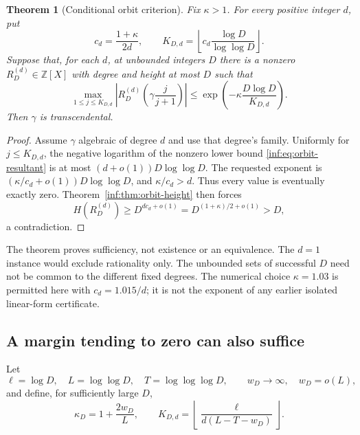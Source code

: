 \documentclass[11pt,a4paper]{article}
\newcommand{\Z}{\mathbb Z}
\newtheorem{theorem}{Theorem}[section]
\theoremstyle{definition}
\theoremstyle{remark}
\numberwithin{equation}{section}
\begin{document}
\begin{theorem}[Conditional orbit criterion]\label{inf:thm:kappa}
Fix $\kappa>1$. For every positive integer $d$, put
\[
 c_d=\frac{1+\kappa}{2d},\qquad
 K_{D,d}=\left\lfloor c_d\frac{\log D}{\log\log D}\right\rfloor.
\]
Suppose that, for each $d$, at unbounded integers $D$ there is a nonzero $R_D^{(d)}\in\Z[X]$ with degree and height at most $D$ such that
\begin{equation}\label{inf:eq:orbit-hypothesis}
 \max_{1\le j\le K_{D,d}}
 \left|R_D^{(d)}\left(\gamma\frac j{j+1}\right)\right|
 \le\exp\left(-\kappa\frac{D\log D}{K_{D,d}}\right).
\end{equation}
Then $\gamma$ is transcendental.
\end{theorem}
\begin{proof}
Assume $\gamma$ algebraic of degree $d$ and use that degree's family. Uniformly for $j\le K_{D,d}$, the negative logarithm of the nonzero lower bound \eqref{inf:eq:orbit-resultant} is at most $(d+o(1))D\log\log D$. The requested exponent is $(\kappa/c_d+o(1))D\log\log D$, and $\kappa/c_d>d$. Thus every value is eventually exactly zero. Theorem~\ref{inf:thm:orbit-height} then forces
\[
 H(R_D^{(d)})\ge D^{dc_d+o(1)}=D^{(1+\kappa)/2+o(1)}>D,
\]
a contradiction.
\end{proof}
The theorem proves sufficiency, not existence or an equivalence. The $d=1$ instance would exclude rationality only. The unbounded sets of successful $D$ need not be common to the different fixed degrees. The numerical choice $\kappa=1.03$ is permitted here with $c_d=1.015/d$; it is not the exponent of any earlier isolated linear-form certificate.

\subsection{A margin tending to zero can also suffice}
\label{inf:sub:vanishing}
Let
\[
 \ell=\log D,\quad L=\log\log D,\quad T=\log\log\log D,
 \qquad w_D\to\infty,\quad w_D=o(L),
\]
and define, for sufficiently large $D$,
\begin{equation}\label{inf:eq:vanishing-schedule}
 \kappa_D=1+\frac{2w_D}{L},\qquad
 K_{D,d}=\left\lfloor\frac\ell{d(L-T-w_D)}\right\rfloor.
\end{equation}
\end{document}
